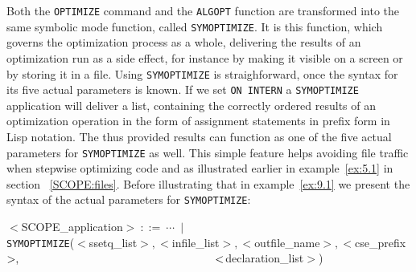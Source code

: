 {Both the {\tt OPTIMIZE} command and the {\tt ALGOPT} function are transformed
into the same symbolic mode function, called {\tt SYMOPTIMIZE}. It is this
function, which governs the optimization process as a whole, delivering
the results of an optimization run as a side effect, for instance by making
it visible on a screen or by storing it in a file. Using {\tt SYMOPTIMIZE}
is straighforward, once the syntax for its five actual parameters is known.
If we set {\tt ON INTERN} a {\tt SYMOPTIMIZE} application will deliver a
list, containing the correctly ordered results of an optimization operation
in the form of assignment statements in prefix form in Lisp notation. The thus
provided results can function as one of the five actual parameters for
{\tt SYMOPTIMIZE} as well. This simple feature helps avoiding file traffic
when stepwise optimizing code and as illustrated earlier in example~\ref{ex:5.1}
in section ~\ref{SCOPE:files}. Before illustrating that in example~\ref{ex:9.1}
we present the syntax of the actual parameters for {\tt SYMOPTIMIZE}:

$<$SCOPE\_application$>~::=~\cdots~\mid$\\
\hspace*{1cm} {\tt SYMOPTIMIZE}($<$ssetq\_list$>,<$infile\_list$>,<$outfile\_name$>,<$cse\_prefix$>,\\
\hspace*{6cm} <$declaration\_list$>$)

}

